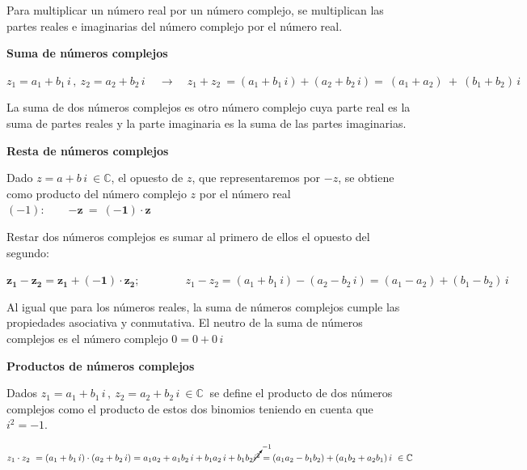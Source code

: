Para multiplicar un número real por un número complejo, se multiplican las partes reales e imaginarias del número complejo por el número real.

\vspace{5mm}
\textbf{Suma de números complejos}

$z_1=a_1+b_1\, i\, , \ z_2=a_2+b_2\, i\,  \quad \to \quad
z_1+z_2 \ =  (a_1+b_1\, i)+(a_2+b_2\, i)=\  (a_1+a_2) \ + \ (b_1+b_2)\, i$

\begin{destacado}
La suma de dos números complejos es otro número complejo cuya parte real es la suma de partes reales y la parte imaginaria es la suma de las partes imaginarias.
\end{destacado}

\vspace{5mm}
\textbf{Resta de números complejos}

\begin{definition}

Dado $z=a+b\, i \ \in \mathbb C$, el opuesto de $z$, que representaremos por $-z$, se obtiene como producto del número complejo $z$ por el número real $(-1):\qquad \boldsymbol{-z\ = \ (-1) \cdot z}$	
\end{definition}

\begin{destacado}
Restar dos números complejos es sumar al primero de ellos el opuesto del segundo: \end{destacado}

$\boldsymbol{z_1-z_2=z_1+(-1)\cdot z_2}; \qquad \qquad z_1-z_2=(a_1+b_1\, i)-(a_2-b_2\, i)=(a_1-a_2)+(b_1-b_2)\, i$

Al igual que para los números reales, la suma de números complejos cumple las propiedades asociativa y conmutativa. El neutro de la suma de números complejos es el número complejo $0=0+ 0 \, i$

\vspace{5mm}
\textbf{Productos de números complejos}

\begin{destacado}
Dados  $z_1=a_1+b_1\, i\, , \ z_2=a_2+b_2\, i \ \in \mathbb C \ $ se define el producto de dos números complejos como el producto de estos dos binomios teniendo en cuenta que $i^2=-1$.\end{destacado}

$z_1\cdot z_2 \ =  (a_1+b_1\, i)\cdot (a_2+b_2\, i)=a_1a_2+a_1b_2\, i+b_1a_2\, i+b_1b_2 \cancelto{-1}{i^2}=(a_1a_2-b_1b_2)+(a_1b_2+a_2b_1)\, i\ \in \mathbb C$  

